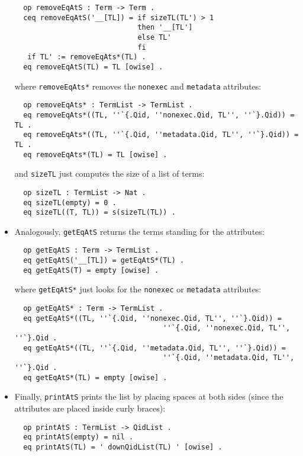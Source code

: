 \begin{itemize}
{\codesize
\begin{verbatim}
  op removeEqAtS : Term -> Term .
  ceq removeEqAtS('__[TL]) = if sizeTL(TL') > 1
                             then '__[TL']
                             else TL'
                             fi
   if TL' := removeEqAts*(TL) .
  eq removeEqAtS(TL) = TL [owise] .
\end{verbatim}
}

\noindent
where \verb"removeEqAts*" removes the \verb"nonexec" and \verb"metadata" attributes:

{\codesize
\begin{verbatim}
  op removeEqAts* : TermList -> TermList .
  eq removeEqAts*((TL, ''`{.Qid, ''nonexec.Qid, TL'', ''`}.Qid)) = TL .
  eq removeEqAts*((TL, ''`{.Qid, ''metadata.Qid, TL'', ''`}.Qid)) = TL .
  eq removeEqAts*(TL) = TL [owise] .
\end{verbatim}
}

\noindent
and \verb"sizeTL" just computes the size of a list of terms:

{\codesize
\begin{verbatim}
  op sizeTL : TermList -> Nat .
  eq sizeTL(empty) = 0 .
  eq sizeTL((T, TL)) = s(sizeTL(TL)) .
\end{verbatim}
}

\item
Analogously, \verb"getEqAtS" returns the terms standing for the attributes:

{\codesize
\begin{verbatim}
  op getEqAtS : Term -> TermList .
  eq getEqAtS('__[TL]) = getEqAtS*(TL) .
  eq getEqAtS(T) = empty [owise] .
\end{verbatim}
}

\noindent
where \verb"getEqAtS*" just looks for the \verb"nonexec" or \verb"metadata" attributes:

{\codesize
\begin{verbatim}
  op getEqAtS* : Term -> TermList .
  eq getEqAtS*((TL, ''`{.Qid, ''nonexec.Qid, TL'', ''`}.Qid)) =
                                   ''`{.Qid, ''nonexec.Qid, TL'', ''`}.Qid .
  eq getEqAtS*((TL, ''`{.Qid, ''metadata.Qid, TL'', ''`}.Qid)) =
                                   ''`{.Qid, ''metadata.Qid, TL'', ''`}.Qid .
  eq getEqAtS*(TL) = empty [owise] .
\end{verbatim}
}

\item
Finally, \verb"printAtS" prints the list by placing spaces at both sides (since
the attributes are placed inside curly braces):

{\codesize
\begin{verbatim}
  op printAtS : TermList -> QidList .
  eq printAtS(empty) = nil .
  eq printAtS(TL) = ' downQidList(TL) ' [owise] .
\end{verbatim}
}

\end{itemize}


